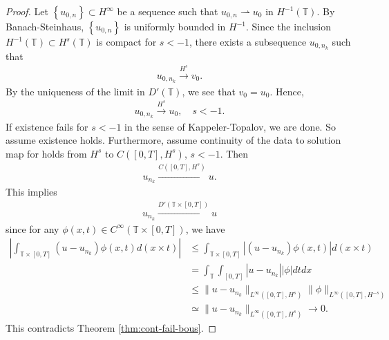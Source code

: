 \documentclass[12pt,reqno]{amsart}
\numberwithin{equation}{section}  %
\newcommand{\ci}{\mathbb{T}}
\begin{document}
    \begin{proof}
      Let 
      $\left\{ u_{0,n} \right\} \subset H^{\infty}$ be a sequence such that $u_{0,n}
      \rightharpoonup u_{0}$ in $H^{-1}(\ci)$. By Banach-Steinhaus, $\left\{
      u_{0,n}
      \right\}$ is uniformly bounded in $H^{-1}$.
      Since the
      inclusion $H^{-1}(\ci) \subset H^{s}(\ci)$ is compact for $s<-1$, there
      exists a subsequence $u_{0,n_{k}}$ such that
      \begin{equation*}
      \begin{split}
        u_{0,n_{k}} \xrightarrow{H^{s}} v_{0}.
      \end{split}
      \end{equation*}
      By the uniqueness of the limit in $D'(\ci)$, we see that $v_{0} = u_{0}$. 
      Hence,
      \begin{equation*}
      \begin{split}
        u_{0,n_{k}} \xrightarrow{H^{s}}u_{0}, \quad s<-1.
      \end{split}
      \end{equation*}
      If existence fails for $s<-1$ in the sense of
      Kappeler-Topalov, we are done. So assume
      existence holds. Furthermore, assume continuity of the data to solution map for
      holds from $H^{s}$ to $C([0, T], H^{s})$, $s < -1$. Then
      \begin{equation}
        \label{s-conv-bous}
      \begin{split}
      u_{n_{k}} \xrightarrow{C\left( [0,T], H^{s} \right)} u.
      \end{split}
      \end{equation}
      This implies
      \begin{equation*}
      \begin{split}
        u_{n_{k}} \xrightarrow{D'(\ci \times [0, T])} u
      \end{split}
      \end{equation*}
      since for any $\phi(x,t) \in C^{\infty}\left( \ci \times [0,T] \right)$,
      we have
      \begin{equation*}
      \begin{split}
        | \int_{\ci \times [0,T]} (u - u_{n_{k}}) \phi(x,t) d (x \times t) |
        & \le  \int_{\ci \times [0,T]} | (u - u_{n_{k}}) \phi(x,t)| d (x \times t) 
        \\
        & = \int_{\ci} \int_{[0,T]} | u - u_{n_{k}} | | \phi | dt dx
        \\
        & \le \| u - u_{n_{k}} \|_{L^{\infty}\left( [0,T], H^{s} \right)} \|
        \phi \|_{L^{\infty}\left( [0,T], H^{-s} \right)}
        \\
        & \simeq \| u - u_{n_{k}} \|_{L^{\infty}\left( [0,T], H^{s} \right)} \to
        0.
      \end{split}
      \end{equation*}
     This contradicts Theorem \ref{thm:cont-fail-bous}.

    \end{proof}
\end{document}

